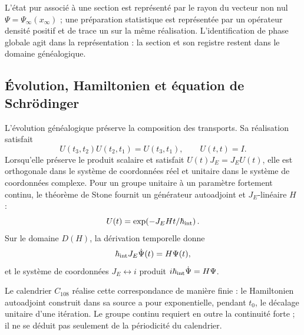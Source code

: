 \begin{principle}
\label{v:rec:realizacion_evolucion:statement:02}
L’état pur associé à une section est représenté par le rayon du vecteur
non nul \(\Psi=\Psi_\infty(x_\infty)\) ; une préparation statistique est
représentée par un opérateur densité positif et de trace un sur la même
réalisation. L’identification de phase globale agit dans la représentation :
la section et son registre restent dans le domaine généalogique.
\end{principle}

\subsection{Évolution, Hamiltonien et équation de Schrödinger}
\label{v:rec:realizacion_evolucion:section:03}

L’évolution généalogique préserve la composition des transports. Sa
réalisation satisfait
\[
 U(t_3,t_2)U(t_2,t_1)=U(t_3,t_1),
 \qquad U(t,t)=I.
\]
Lorsqu’elle préserve le produit scalaire et satisfait
\(U(t)J_E=J_EU(t)\), elle est orthogonale dans le système de coordonnées réel et unitaire dans le système de coordonnées
complexe. Pour un groupe unitaire à un paramètre fortement continu, le
théorème de Stone fournit un générateur autoadjoint et \(J_E\)-linéaire
\(H\)~\cite{Stone1932} :
\[
 U(t)=\exp\!\left(-J_E H t/\hbar_{\rm int}\right).
\]
Sur le domaine \(D(H)\), la dérivation temporelle donne
\begin{equation}
 \hbar_{\rm int}J_E\dot\Psi(t)=H\Psi(t),
 \label{v:rec:eq:schrodinger-genealogico-rev2}
\end{equation}
et le système de coordonnées \(J_E\leftrightarrow i\) produit
\(i\hbar_{\rm int}\dot\Psi=H\Psi\).

Le calendrier \(C_{108}\) réalise cette correspondance de manière finie :
le Hamiltonien autoadjoint construit dans sa source a pour
exponentielle, pendant \(t_0\), le décalage unitaire d’une itération. Le
groupe continu requiert en outre la continuité forte ; il ne se déduit pas
seulement de la périodicité du calendrier.
